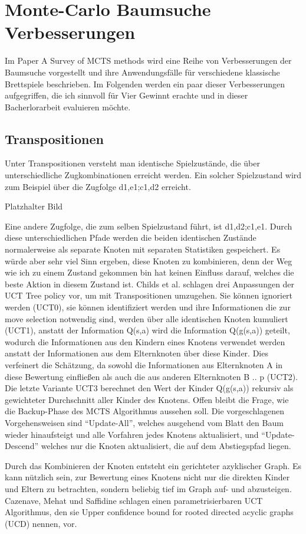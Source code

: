 \section{Monte-Carlo Baumsuche Verbesserungen}
Im Paper A Survey of MCTS methods wird eine Reihe von Verbesserungen der Baumsuche vorgestellt und ihre Anwendungsfälle für verschiedene klassische Brettspiele beschrieben. Im Folgenden werden ein paar dieser Verbesserungen aufgegriffen, die ich sinnvoll für Vier Gewinnt erachte und in dieser Bacherlorarbeit evaluieren möchte.

\subsection{Transpositionen}
\label{transpos}
Unter Transpositionen versteht man identische Spielzustände, die über unterschiedliche Zugkombinationen erreicht werden. Ein solcher Spielzustand wird zum Beispiel über die Zugfolge d1,e1;c1,d2 erreicht. 

Platzhalter Bild

Eine andere Zugfolge, die zum selben Spielzustand führt, ist d1,d2;c1,e1. Durch diese unterschiedlichen Pfade werden die beiden identischen Zustände normalerweise als separate Knoten mit separaten Statistiken gespeichert. Es würde aber sehr viel Sinn ergeben, diese Knoten zu kombinieren, denn der Weg wie ich zu einem Zustand gekommen bin hat keinen Einfluss darauf, welches die beste Aktion in diesem Zustand ist. Childs et al. schlagen drei Anpassungen der UCT Tree policy vor, um mit Transpositionen umzugehen. Sie können ignoriert werden (UCT0), sie können identifiziert werden und ihre Informationen die zur move selection notwendig sind, werden über alle identischen Knoten kumuliert (UCT1), anstatt der Information Q(s,a) wird die Information Q(g(s,a)) geteilt, wodurch die Informationen aus den Kindern eines Knotens verwendet werden anstatt der Informationen aus dem Elternknoten über diese Kinder. Dies verfeinert die Schätzung, da sowohl die Informationen aus Elternknoten A in diese Bewertung einfließen als auch die aus anderen Elternknoten B .. p (UCT2). Die letzte Variante UCT3 berechnet den Wert der Kinder Q(g(s,a)) rekursiv als gewichteter Durchschnitt aller Kinder des Knotens. Offen bleibt die Frage, wie die Backup-Phase des MCTS Algorithmus aussehen soll. Die vorgeschlagenen Vorgehensweisen sind “Update-All”, welches ausgehend vom Blatt den Baum wieder hinaufsteigt und alle Vorfahren jedes Knotens aktualisiert, und “Update-Descend” welches nur die Knoten aktualisiert, die auf dem Abstiegspfad liegen.\\
\par
Durch das Kombinieren der Knoten entsteht ein gerichteter azyklischer Graph. Es kann nützlich sein, zur Bewertung eines Knotens nicht nur die direkten Kinder und Eltern zu betrachten, sondern beliebig tief im Graph auf- und abzusteigen. Cazenave, Mehat und Saffidine schlagen einen parametrisierbaren UCT Algorithmus, den sie Upper confidence bound for rooted directed acyclic graphs (UCD) nennen, vor.

